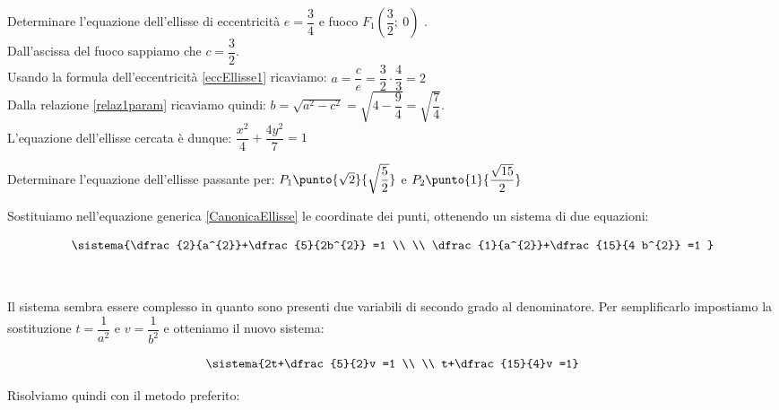 \begin{esempio}
Determinare l'equazione dell'ellisse di eccentricità $e=\dfrac{3}{4} $ e fuoco $ F_{1} \left( \dfrac{3}{2} ;~0\right)$ .
\\[1pt]
Dall'ascissa del fuoco sappiamo che $c= \dfrac{3}{2} $.\\[3pt]
Usando la formula dell'eccentricità \eqref{eccEllisse1} ricaviamo:
$a=\dfrac{c}{e}=\dfrac{3}{2}\cdot\dfrac{4}{3}=2$\\[3pt]
Dalla relazione \eqref{relaz1param} ricaviamo quindi: 
$b=\sqrt{a^{2}-c^{2}}=\sqrt{4-\dfrac{9}{4}}=\sqrt{\dfrac{7}{4}}$.\\[3pt]
L'equazione dell'ellisse cercata è dunque: $ 
\dfrac{x^{2}}{4}+\dfrac{4y^{2}}{7} =1$
\end{esempio}

\begin{esempio} 
 
Determinare l'equazione dell'ellisse 
passante per: $P_{1} \punto{\sqrt{2}}{\sqrt{\dfrac{5}{2}}}$ e $P_{2} \punto{1}{\dfrac{\sqrt{15}}{2}}$\\[2pt]
  \begin{minipage}{.7\textwidth}
   Sostituiamo nell'equazione generica \eqref{CanonicaEllisse} le coordinate dei 
punti, ottenendo un sistema di due equazioni:
  \end{minipage}
  \begin{minipage}{.3\textwidth}
\[\sistema{\dfrac{2}{a^{2}}+\dfrac{5}{2b^{2}} =1   \\ \\ 
\dfrac{1}{a^{2}}+\dfrac{15}{4 b^{2}} =1 }\]
  \end{minipage}\\[10pt]
  \begin{minipage}{.7\textwidth}
Il sistema sembra essere complesso in quanto sono 
presenti due variabili di secondo grado al denominatore. Per semplificarlo 
impostiamo la sostituzione 
$t= \dfrac{1}{a^{2}} $ e $v= \dfrac{1}{b^{2}} $ 
e otteniamo il nuovo sistema:
  \end{minipage}
  \begin{minipage}{.3\textwidth}
\[\sistema{2t+\dfrac{5}{2}v =1 \\ \\ t+\dfrac{15}{4}v =1}\]
  \end{minipage}
  
\vspace{10pt}

\noindent Risolviamo quindi con il metodo preferito:


\end{esempio}
